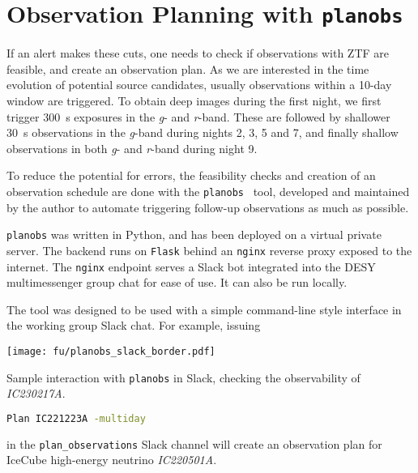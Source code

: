 \section{Observation Planning with \texttt{planobs}}\label{planobs}

If an alert makes these cuts, one needs to check if observations with ZTF are feasible, and create an observation plan. As we are interested in the time evolution of potential source candidates, usually observations within a 10-day window are triggered. To obtain deep images during the first night, we first trigger \SI{300}{\second} exposures in the \textit{g}- and \textit{r}-band. These are followed by shallower \SI{30}{\second} observations in the \textit{g}-band during nights 2, 3, 5 and 7, and finally shallow observations in both \textit{g}- and \textit{r}-band during night 9.

To reduce the potential for errors, the feasibility checks and creation of an observation schedule are done with the \texttt{planobs}~ tool, developed and maintained by the author to automate triggering follow-up observations as much as possible.

\texttt{planobs} was written in Python, and has been deployed on a virtual private server. The backend runs on \texttt{Flask} behind an \texttt{nginx} reverse proxy exposed to the internet. The \texttt{nginx} endpoint serves a Slack bot integrated into the DESY multimessenger group chat for ease of use. It can also be run locally.

The tool was designed to be used with a simple command-line style interface in the working group Slack chat. For example, issuing

\begin{marginfigure}
    \texttt{[image: fu/planobs\_slack\_border.pdf]}
    \caption[\texttt{planobs} Slack interaction]{Sample interaction with \texttt{planobs} in Slack, checking the observability of \textit{IC230217A}.}
\end{marginfigure}

\begin{lstlisting}[language=bash,style=kaolstplain]
Plan IC221223A -multiday
\end{lstlisting}
in the \texttt{plan\_observations} Slack channel will create an observation plan for IceCube high-energy neutrino \textit{IC220501A}.

